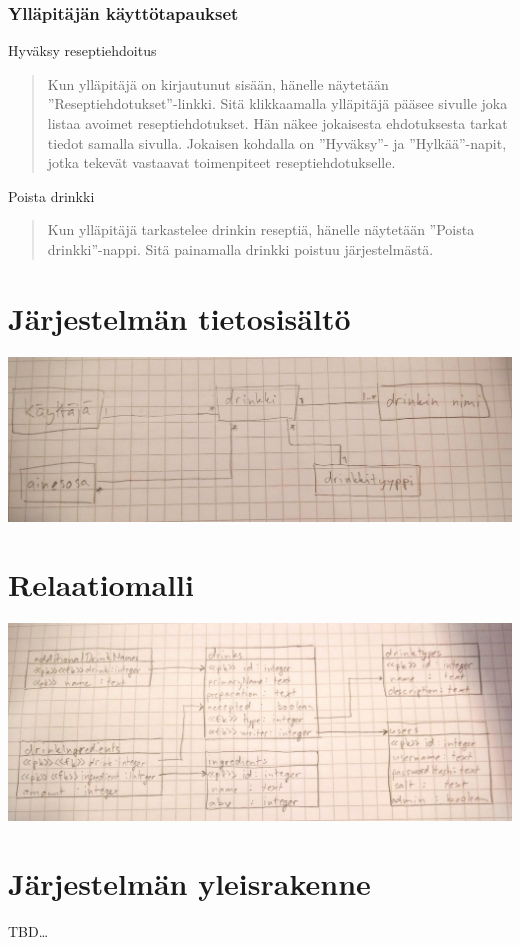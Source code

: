 \documentclass[a4paper]{article}
\begin{document}
\subsubsection{Ylläpitäjän käyttötapaukset}
Hyväksy reseptiehdoitus
\begin{quote}
  Kun ylläpitäjä on kirjautunut sisään, hänelle näytetään ''Reseptiehdotukset''-linkki. Sitä klikkaamalla ylläpitäjä pääsee sivulle joka listaa avoimet reseptiehdotukset. Hän näkee jokaisesta ehdotuksesta tarkat tiedot samalla sivulla. Jokaisen kohdalla on ''Hyväksy''- ja ''Hylkää''-napit, jotka tekevät vastaavat toimenpiteet reseptiehdotukselle.
\end{quote}
Poista drinkki
\begin{quote}
  Kun ylläpitäjä tarkastelee drinkin reseptiä, hänelle näytetään ''Poista drinkki''-nappi. Sitä painamalla drinkki poistuu järjestelmästä.
\end{quote}

\section{Järjestelmän tietosisältö}
\includegraphics[width=\textwidth]{tietosisalto}

\section{Relaatiomalli}
\includegraphics[width=\textwidth]{relation-diagram}

\section{Järjestelmän yleisrakenne}
TBD\ldots{}
\end{document}

